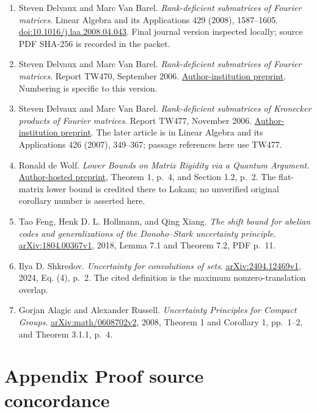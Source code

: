 \documentclass[
  11pt,
  letterpaper,
]{article}
\providecommand{\tightlist}{%
  \setlength{\itemsep}{0pt}\setlength{\parskip}{0pt}}
\begin{document}
\begin{enumerate}
\def\labelenumi{\arabic{enumi}.}
\tightlist
\item
  Steven Delvaux and Marc Van Barel. \emph{Rank-deficient submatrices of
  Fourier matrices}. Linear Algebra and its Applications 429 (2008),
  1587--1605.
  \href{https://doi.org/10.1016/j.laa.2008.04.043}{doi:10.1016/j.laa.2008.04.043}.
  Final journal version inspected locally; source PDF SHA-256 is
  recorded in the packet.
\item
  Steven Delvaux and Marc Van Barel. \emph{Rank-deficient submatrices of
  Fourier matrices}. Report TW470, September 2006.
  \href{https://www.cs.kuleuven.be/publicaties/rapporten/tw/TW470.pdf}{Author-institution
  preprint}. Numbering is specific to this version.
\item
  Steven Delvaux and Marc Van Barel. \emph{Rank-deficient submatrices of
  Kronecker products of Fourier matrices}. Report TW477, November 2006.
  \href{https://www.cs.kuleuven.be/publicaties/rapporten/tw/TW477.pdf}{Author-institution
  preprint}. The later article is in Linear Algebra and its Applications
  426 (2007), 349--367; passage references here use TW477.
\item
  Ronald de Wolf. \emph{Lower Bounds on Matrix Rigidity via a Quantum
  Argument}.
  \href{https://homepages.cwi.nl/~rdewolf/publ/qc/qrigid.pdf}{Author-hosted
  preprint}, Theorem 1, p.~4, and Section 1.2, p.~2. The flat-matrix
  lower bound is credited there to Lokam; no unverified original
  corollary number is asserted here.
\item
  Tao Feng, Henk D. L. Hollmann, and Qing Xiang. \emph{The shift bound
  for abelian codes and generalizations of the Donoho--Stark uncertainty
  principle}.
  \href{https://arxiv.org/pdf/1804.00367v1}{arXiv:1804.00367v1}, 2018,
  Lemma 7.1 and Theorem 7.2, PDF p.~11.
\item
  Ilya D. Shkredov. \emph{Uncertainty for convolutions of sets}.
  \href{https://arxiv.org/pdf/2404.12469v1}{arXiv:2404.12469v1}, 2024,
  Eq. (4), p.~2. The cited definition is the maximum nonzero-translation
  overlap.
\item
  Gorjan Alagic and Alexander Russell. \emph{Uncertainty Principles for
  Compact Groups}.
  \href{https://arxiv.org/pdf/math/0608702v2}{arXiv:math/0608702v2},
  2008, Theorem 1 and Corollary 1, pp.~1--2, and Theorem 3.1.1, p.~4.
\end{enumerate}

\section{Appendix Proof source
concordance}\label{appendix-proof-source-concordance}
\end{document}
